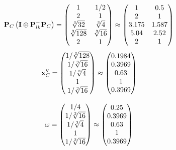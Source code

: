 \documentclass[10pt,a4paper]{article}
\begin{document}
	\[
		\bold{P}_{C}\left(\bold{I} \oplus \bold{P}_{lk}^{-}\bold{P}_{C}\right) = 
		\begin{pmatrix}
			{1}{} & {1} / {{2}} \\
			{{2}}{} & {1}{} \\
			{\sqrt[3]{32}}{} & {\sqrt[3]{4}}{} \\
			{\sqrt[3]{128}}{} & {\sqrt[3]{16}}{} \\
			{{2}}{} & {1}{} \\
		\end{pmatrix}
		\approx
		\begin{pmatrix}
			1        & 0.5      \\
			2        & 1        \\
			3.175    & 1.587    \\
			5.04     & 2.52     \\
			2        & 1        \\
		\end{pmatrix}
	\]
	\[
		\bold{x}''_{C} = 
		\begin{pmatrix}
			{1} / {\sqrt[3]{128}} \\
			{1} / {\sqrt[3]{16}} \\
			{1} / {\sqrt[3]{4}} \\
			{1}{} \\
			{1} / {\sqrt[3]{16}} \\
		\end{pmatrix}
		\approx
		\begin{pmatrix}
			0.1984   \\
			0.3969   \\
			0.63     \\
			1        \\
			0.3969   \\
		\end{pmatrix}
	\]

	\[
		\bold{\omega} = 
		\begin{pmatrix}
			{1} / {{4}} \\
			{1} / {\sqrt[3]{16}} \\
			{1} / {\sqrt[3]{4}} \\
			{1}{} \\
			{1} / {\sqrt[3]{16}} \\
		\end{pmatrix}
		\approx
		\begin{pmatrix}
			0.25     \\
			0.3969   \\
			0.63     \\
			1        \\
			0.3969   \\
		\end{pmatrix}
	\]
\end{document}
